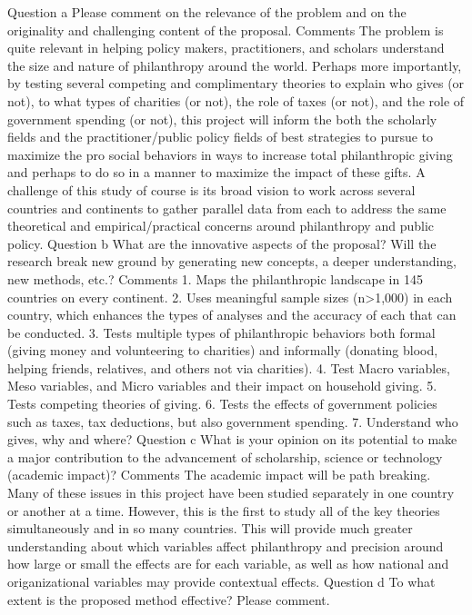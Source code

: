 \documentclass[twocolumn, serif, rga, numeric]{jote-article}
\begin{document}
Question a
Please comment on the relevance of the problem and on the originality and challenging content of the proposal.
Comments
The problem is quite relevant in helping policy makers, practitioners, and scholars understand the size and nature of philanthropy around the world. Perhaps more importantly, by testing several competing and complimentary theories to explain who gives (or not), to what types of charities (or not), the role of taxes (or not), and the role of government spending (or not), this project will inform the both the scholarly fields and the practitioner/public policy fields of best strategies to pursue to maximize the pro social behaviors in ways to increase total philanthropic giving and perhaps to do so in a manner to maximize the impact of these gifts.
A challenge of this study of course is its broad vision to work across several countries and continents to gather parallel data from each to address the same theoretical and empirical/practical concerns around philanthropy and public policy.
Question b
What are the innovative aspects of the proposal? Will the research break new ground by generating new concepts, a deeper understanding, new methods, etc.?
Comments
1. Maps the philanthropic landscape in 145 countries on every continent.
2. Uses meaningful sample sizes (n>1,000) in each country, which enhances the types of analyses and the accuracy of each that can be conducted.
3. Tests multiple types of philanthropic behaviors both formal (giving money and volunteering to charities) and informally (donating blood, helping friends, relatives, and others not via charities).
4. Test Macro variables, Meso variables, and Micro variables and their impact on household giving.
5. Tests competing theories of giving.
6. Tests the effects of government policies such as taxes, tax deductions, but also government spending.
7. Understand who gives, why and where?
Question c
What is your opinion on its potential to make a major contribution to the advancement of scholarship, science or technology (academic impact)?
Comments
The academic impact will be path breaking. Many of these issues in this project have been studied separately in one country or another at a time. However, this is the first to study all of the key theories simultaneously and in so many countries. This will provide much greater understanding about which variables affect philanthropy and precision around how large or small the effects are for each variable, as well as how national and origanizational variables may provide contextual effects.
Question d
To what extent is the proposed method effective? Please comment.
\end{document}
